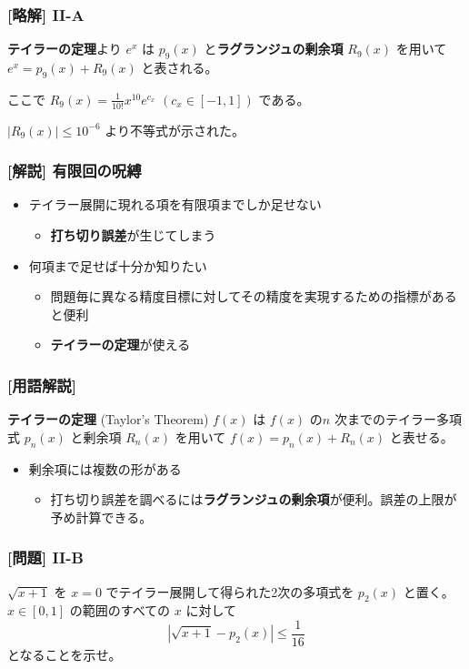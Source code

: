 \documentclass[dvipdfmx,aspectratio=169,20pt]{beamer}
\begin{document}
\begin{frame}
\frametitle{[略解] I\hspace{-.01em}I-A}
{\bf テイラーの定理}より $e^x$ は $p_9(x)$ と{\bf ラグランジュの剰余項} $R_9(x)$ を用いて $e^x = p_9(x)+R_9(x)$ と表される。
\vspace{0.5cm}

ここで $R_9(x)=\frac{1}{10!}x^{10}e^{c_x}$ $(c_x\in [-1,1])$ である。
\vspace{0.5cm}

$|R_9(x)|\le 10^{-6}$ より不等式が示された。

\end{frame}
\begin{frame}
\frametitle{[解説] 有限回の呪縛}
\begin{itemize}
    \setlength{\itemsep}{0.5cm}
    \item テイラー展開に現れる項を有限項までしか足せない
    \begin{itemize}
        \item {\bf 打ち切り誤差}が生じてしまう
    \end{itemize}
    \item 
    何項まで足せば十分か知りたい
    \begin{itemize}
        \item 問題毎に異なる精度目標に対してその精度を実現するための指標があると便利
        \item {\bf テイラーの定理}が使える
    \end{itemize}
\end{itemize}
\end{frame}
\begin{frame}
\frametitle{{\large [用語解説]}}
\begin{block}{{\bf テイラーの定理} {\small (Taylor's Theorem)}}
$f(x)$ は $f(x)$ の$n$ 次までのテイラー多項式 $p_n(x)$ と剰余項 $R_n(x)$ を用いて
$f(x)=p_n(x)+R_n(x)$ と表せる。
\end{block}
\begin{itemize}
    \item 剰余項には複数の形がある
    \begin{itemize}
        \item 打ち切り誤差を調べるには{\bf ラグランジュの剰余項}が便利。誤差の上限が予め計算できる。
    \end{itemize}
\end{itemize}
\end{frame}
\begin{frame}
\frametitle{[問題] I\hspace{-.01em}I-B}
$\sqrt{x+1}$ を $x=0$ でテイラー展開して得られた2次の多項式を $p_2(x)$ と置く。
$x\in [0,1]$ の範囲のすべての $x$ に対して
\begin{equation*}
    |\sqrt{x+1} - p_2(x)|\le \frac{1}{16}
\end{equation*}
となることを示せ。
\end{frame}
\end{document}
